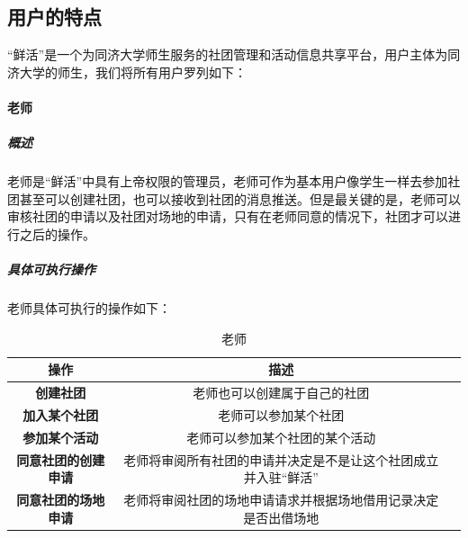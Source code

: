 \documentclass[UTF8]{ctexart}
\begin{document}
\subsection{用户的特点}
“鲜活”是一个为同济大学师生服务的社团管理和活动信息共享平台，用户主体为同济大学的师生，我们将所有用户罗列如下：

\paragraph{老师}
\subparagraph{概述}
老师是“鲜活”中具有上帝权限的管理员，老师可作为基本用户像学生一样去参加社团甚至可以创建社团，也可以接收到社团的消息推送。但是最关键的是，老师可以审核社团的申请以及社团对场地的申请，只有在老师同意的情况下，社团才可以进行之后的操作。
\subparagraph{具体可执行操作}
老师具体可执行的操作如下：
\newline
\newline
\begin{table}[H]
\centering
\caption{老师}
\begin{tabular}{ccc}
\toprule
操作& 描述\\
\midrule
\textbf{创建社团}& 老师也可以创建属于自己的社团\\
\textbf{加入某个社团}& 老师可以参加某个社团\\
\textbf{参加某个活动}&老师可以参加某个社团的某个活动\\
\textbf{同意社团的创建申请}&老师将审阅所有社团的申请并决定是不是让这个社团成立并入驻“鲜活”\\
\textbf{同意社团的场地申请}&老师将审阅社团的场地申请请求并根据场地借用记录决定是否出借场地\\
\bottomrule
\end{tabular}
\end{table}
\end{document}
